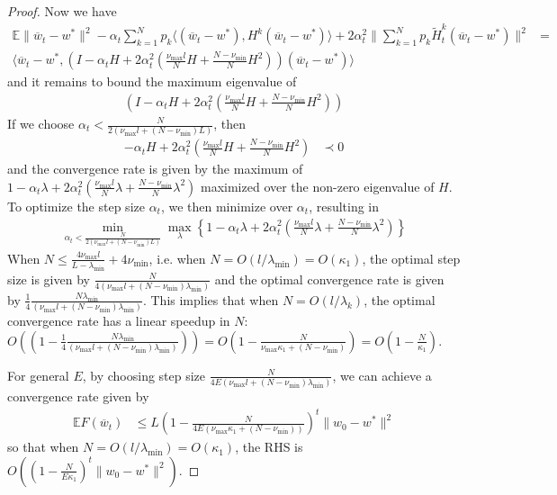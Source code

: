 \begin{proof}
		Now we have 
		\begin{align*}
		\mathbb{E}\|\overline{w}_{t}-w^{\ast}\|^{2}-\alpha_{t}\sum_{k=1}^{N}p_{k}\langle(\overline{w}_{t}-w^{\ast}),H^{k}(\overline{w}_{t}-w^{\ast})\rangle+2\alpha_{t}^{2}\|\sum_{k=1}^{N}p_{k}\tilde{H}_{t}^{k}(\overline{w}_{t}-w^{\ast})\|^{2} & =\\
		\langle\overline{w}_{t}-w^{\ast},(I-\alpha_{t}H+2\alpha_{t}^{2}(\frac{\nu_{\max}l}{N}H+\frac{N-\nu_{\min}}{N}H^{2}))(\overline{w}_{t}-w^{\ast})\rangle
		\end{align*}
		and it remains to bound the maximum eigenvalue of 
		\begin{align*}
		(I-\alpha_{t}H+2\alpha_{t}^{2}(\frac{\nu_{\max}l}{N}H+\frac{N-\nu_{\min}}{N}H^{2}))
		\end{align*}
		If we choose $\alpha_{t}<\frac{N}{2(\nu_{\max}l+(N-\nu_{\min})L)}$,
		then 
		\begin{align*}
		-\alpha_{t}H+2\alpha_{t}^{2}(\frac{\nu_{\max}l}{N}H+\frac{N-\nu_{\min}}{N}H^{2}) & \prec0
		\end{align*}
		and the convergence rate is given by the maximum of $1-\alpha_{t}\lambda+2\alpha_{t}^{2}(\frac{\nu_{\max}l}{N}\lambda+\frac{N-\nu_{\min}}{N}\lambda^{2})$
		maximized over the non-zero eigenvalue of $H$. To optimize the step
		size $\alpha_{t}$, we then minimize over $\alpha_{t}$, resulting
		in 
		\begin{align*}
		\min_{\alpha_{t}<\frac{N}{2(\nu_{\max}l+(N-\nu_{\min})L)}}\max_{\lambda}\left\{ 1-\alpha_{t}\lambda+2\alpha_{t}^{2}(\frac{\nu_{\max}l}{N}\lambda+\frac{N-\nu_{\min}}{N}\lambda^{2})\right\} 
		\end{align*}
		When $N\leq\frac{4\nu_{\max}l}{L-\lambda_{\min}}+4\nu_{\min}$, i.e.
		when $N=O(l/\lambda_{\min})=O(\kappa_{1})$, the optimal step size
		is given by $\frac{N}{4(\nu_{\max}l+(N-\nu_{\min})\lambda_{\min})}$
		and the optimal convergence rate is given by $\frac{1}{4}\frac{N\lambda_{\min}}{(\nu_{\max}l+(N-\nu_{\min})\lambda_{\min})}$.
		This implies that when $N=O(l/\lambda_{k})$, the optimal convergence
		rate has a linear speedup in $N$: $O((1-\frac{1}{4}\frac{N\lambda_{\min}}{(\nu_{\max}l+(N-\nu_{\min})\lambda_{\min})}))=O(1-\frac{N}{\nu_{\max}\kappa_{1}+(N-\nu_{\min})})=O(1-\frac{N}{\kappa_{1}})$. 
		
		For general $E$, by choosing step size $\frac{N}{4E(\nu_{\max}l+(N-\nu_{\min})\lambda_{\min})}$,
		we can achieve a convergence rate given by 
		\begin{align*}
		\mathbb{E}F(\overline{w}_{t}) & \leq L(1-\frac{N}{4E(\nu_{\max}\kappa_{1}+(N-\nu_{\min}))})^{t}\|w_{0}-w^{\ast}\|^{2}
		\end{align*}
		so that when $N=O(l/\lambda_{\min})=O(\kappa_{1})$, the RHS is $O((1-\frac{N}{E\kappa_{1}})^{t}\|w_{0}-w^{\ast}\|^{2})$. 
		

\end{proof}
